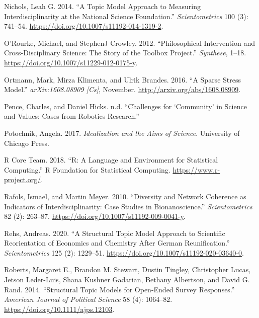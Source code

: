 \documentclass[
  11pt,
]{article}
\newlength{\cslhangindent}
\newenvironment{CSLReferences}[2] %
 {%
  \setlength{\parindent}{0pt}
  \ifodd #1 \everypar{\setlength{\hangindent}{\cslhangindent}}\ignorespaces\fi
  \ifnum #2 > 0
  \setlength{\parskip}{#2\baselineskip}
  \fi
 }%
 {}
\begin{document}
\begin{CSLReferences}{1}{0}
\leavevmode{}%
Nichols, Leah G. 2014. {``A Topic Model Approach to Measuring Interdisciplinarity at the National Science Foundation.''} \emph{Scientometrics} 100 (3): 741--54. \url{https://doi.org/10.1007/s11192-014-1319-2}.

\leavevmode{}%
O'Rourke, Michael, and StephenJ Crowley. 2012. {``Philosophical Intervention and Cross-Disciplinary Science: The Story of the Toolbox Project.''} \emph{Synthese}, 1--18. \url{https://doi.org/10.1007/s11229-012-0175-y}.

\leavevmode{}%
Ortmann, Mark, Mirza Klimenta, and Ulrik Brandes. 2016. {``A Sparse Stress Model.''} \emph{arXiv:1608.08909 {[}Cs{]}}, November. \url{http://arxiv.org/abs/1608.08909}.

\leavevmode{}%
Pence, Charles, and Daniel Hicks. n.d. {``Challenges for {`Community'} in Science and Values: Cases from Robotics Research.''}

\leavevmode{}%
Potochnik, Angela. 2017. \emph{Idealization and the Aims of Science}. University of Chicago Press.

\leavevmode{}%
R Core Team. 2018. {``R: A Language and Environment for Statistical Computing.''} R Foundation for Statistical Computing. \url{https://www.r-project.org/}.

\leavevmode{}%
Rafols, Ismael, and Martin Meyer. 2010. {``Diversity and Network Coherence as Indicators of Interdisciplinarity: Case Studies in Bionanoscience.''} \emph{Scientometrics} 82 (2): 263--87. \url{https://doi.org/10.1007/s11192-009-0041-y}.

\leavevmode{}%
Rehs, Andreas. 2020. {``A Structural Topic Model Approach to Scientific Reorientation of Economics and Chemistry After German Reunification.''} \emph{Scientometrics} 125 (2): 1229--51. \url{https://doi.org/10.1007/s11192-020-03640-0}.

\leavevmode{}%
Roberts, Margaret E., Brandon M. Stewart, Dustin Tingley, Christopher Lucas, Jetson Leder-Luis, Shana Kushner Gadarian, Bethany Albertson, and David G. Rand. 2014. {``Structural Topic Models for Open-Ended Survey Responses.''} \emph{American Journal of Political Science} 58 (4): 1064--82. \url{https://doi.org/10.1111/ajps.12103}.


\end{CSLReferences}
\end{document}
